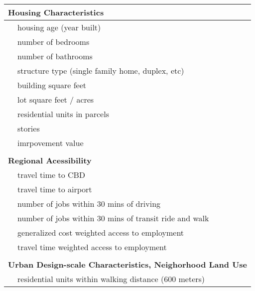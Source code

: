 \begin{tabular}{lp{4in}}

\multicolumn{ 2}{l}{{\bf Housing Characteristics}} \\
\hline
           & housing age (year built) \\

           & number of bedrooms \\

           & number of bathrooms \\

           & structure type (single family home, duplex, etc) \\

           & building square feet \\

           & lot square feet / acres \\

           & residential units in parcels \\

           &    stories \\

           & imrpovement value \\

           &            \\

\multicolumn{ 2}{l}{{\bf Regional Acessibility}} \\
\hline
           & travel time to CBD \\

           & travel time to airport \\

           & number of jobs within 30 mins of driving \\

           & number of jobs within 30 mins of transit ride and walk \\

           & generalized cost weighted access to employment \\

           & travel time weighted access to employment \\

           &            \\

\multicolumn{ 2}{l}{{\bf Urban Design-scale Characteristics, Neighorhood Land Use}} \\
\hline
           & residential units within walking distance (600 meters) \\


\end{tabular}
